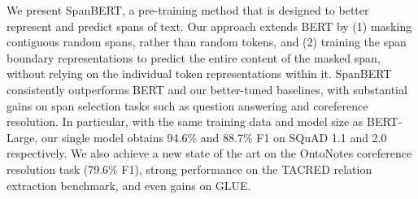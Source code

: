 We present SpanBERT, a pre-training method that is designed to better represent and predict spans of text. Our approach extends BERT by (1) masking contiguous random spans, rather than random tokens, and (2) training the span boundary representations to predict the entire content of the masked span, without relying on the individual token representations within it. SpanBERT consistently outperforms BERT and our better-tuned baselines, with substantial gains on span selection tasks such as question answering and coreference resolution. In particular, with the same training data and model size as BERT-Large, our single model obtains 94.6\% and 88.7\% F1 on SQuAD 1.1 and 2.0 respectively. We also achieve a new state of the art on the OntoNotes coreference resolution task (79.6\% F1), strong performance on the TACRED relation extraction benchmark, and even gains on GLUE.